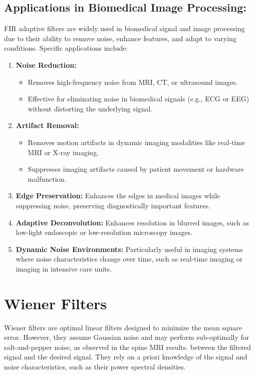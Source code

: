 \documentclass[hidelinks,12pt]{article}
\begin{document}
	\subsection*{Applications in Biomedical Image Processing:}
	FIR adaptive filters are widely used in biomedical signal and image processing due to their ability to remove noise, enhance features, and adapt to varying conditions. Specific applications include:
	\begin{enumerate}
		\item \textbf{Noise Reduction:}
		\begin{itemize}
			\item Removes high-frequency noise from MRI, CT, or ultrasound images.
			\item Effective for eliminating noise in biomedical signals (e.g., ECG or EEG) without distorting the underlying signal.
		\end{itemize}
		\item \textbf{Artifact Removal:}
		\begin{itemize}
			\item Removes motion artifacts in dynamic imaging modalities like real-time MRI or X-ray imaging.
			\item Suppresses imaging artifacts caused by patient movement or hardware malfunction.
		\end{itemize}
		\item \textbf{Edge Preservation:} Enhances the edges in medical images while suppressing noise, preserving diagnostically important features.
		\item \textbf{Adaptive Deconvolution:} Enhances resolution in blurred images, such as low-light endoscopic or low-resolution microscopy images.
		\item \textbf{Dynamic Noise Environments:} Particularly useful in imaging systems where noise characteristics change over time, such as real-time imaging or imaging in intensive care units.
	\end{enumerate}
	
	\section*{Wiener Filters}
	Wiener filters are optimal linear filters designed to minimize the mean square error. However, they assume Gaussian noise and may perform sub-optimally for salt-and-pepper noise, as observed in the spine MRI results. between the filtered signal and the desired signal. They rely on a priori knowledge of the signal and noise characteristics, such as their power spectral densities.
	
\end{document}
